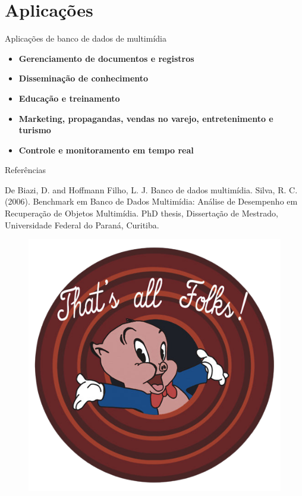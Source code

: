 \documentclass{beamer}
\begin{document}
\section{Aplicações}
    \begin{frame}{Aplicações de banco de dados de multimídia}
        \begin{itemize}
            \item \textbf{Gerenciamento de documentos e registros}
            \item \textbf{Disseminação de conhecimento}
            \item \textbf{Educação e treinamento}
            \item \textbf{Marketing, propagandas, vendas no varejo, entretenimento e turismo}
            \item \textbf{Controle e monitoramento em tempo real}
        \end{itemize}
    \end{frame}

\begin{frame}{Referências}
    
    De Biazi, D. and Hoffmann Filho, L. J. Banco de dados multimídia.
    \addlinespace
    \addlinespace
    Silva, R. C. (2006). Benchmark em Banco de Dados Multimídia: Análise de Desempenho em Recuperação de Objetos Multimídia. PhD thesis, Dissertação de Mestrado,
    Universidade Federal do Paraná, Curitiba.

\end{frame}

\begin{frame}
   \begin{figure}[htpb]
        \begin{center}
            \includegraphics[width=0.6\linewidth]{pic/folkss.PNG}
        \end{center}
    \end{figure}
\end{frame}
\end{document}
